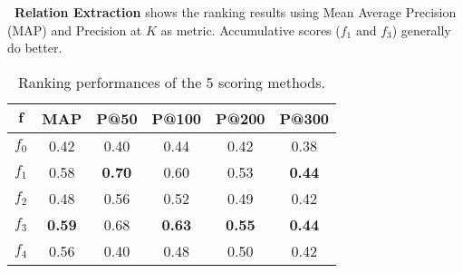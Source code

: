 \noindent
\textbf{\lnear\ Relation Extraction}
 shows the ranking results using
Mean Average Precision (MAP) and Precision at $K$ as metric. 
Accumulative scores ($f_1$ and $f_3$) generally do better.
\begin{table}[th]
	\centering
	\small
	\begin{tabular}{|c|c|c|c|c|c|}
		\hline
		$\mathbf{f}$	& \textbf{MAP} & \textbf{P@50} & \textbf{P@100}  &  \textbf{P@200}& \textbf{P@300}\\ \hline \hline
		$f_0$ & 0.42 & 0.40 & 0.44 & 0.42 & 0.38 \\ \hline
		$f_1$	& 0.58  & {\bf 0.70} & 0.60& 0.53 & {\bf 0.44}\\\hline
		$f_2$	& 0.48 & 0.56 & 0.52  & 0.49 & 0.42\\\hline
		$f_3$	& {\bf 0.59} & 0.68& {\bf 0.63} & {\bf 0.55} & {\bf 0.44}\\\hline
		$f_4$	& 0.56 & 0.40 & 0.48 & 0.50 & 0.42\\\hline
	\end{tabular}
	\caption{Ranking performances of the 5 scoring methods.}
	\label{tab:3m}
\end{table}
\vspace{-0.3cm}

